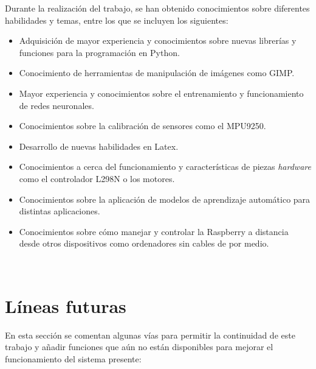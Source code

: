 Durante la realización del trabajo, se han obtenido conocimientos sobre diferentes habilidades y temas, entre los que se incluyen los siguientes:

\begin{itemize}

 \item \textit{} Adquisición de mayor experiencia y conocimientos sobre nuevas librerías y funciones para la programación en Python.
 \item \textit{} Conocimiento de herramientas de manipulación de imágenes como GIMP.
 \item \textit{} Mayor experiencia y conocimientos sobre el entrenamiento y funcionamiento de redes neuronales.
  \item \textit{} Conocimientos sobre la calibración de sensores como el MPU9250.
   \item \textit{} Desarrollo de nuevas habilidades en Latex.
  \item \textit{} Conocimientos a cerca del funcionamiento y características de piezas \textit{hardware} como el controlador L298N o los motores.
  \item \textit{} Conocimientos sobre la aplicación de modelos de aprendizaje automático para distintas aplicaciones.
  \item \textit{} Conocimientos sobre cómo manejar y controlar la Raspberry a distancia desde otros dispositivos como ordenadores sin cables de por medio.
  
\end{itemize}\


\section{Líneas futuras}
\label{sec:lineas_futuras}

En esta sección se comentan algunas vías para permitir la continuidad de este trabajo y añadir funciones que aún no están disponibles para mejorar el funcionamiento del sistema presente:

